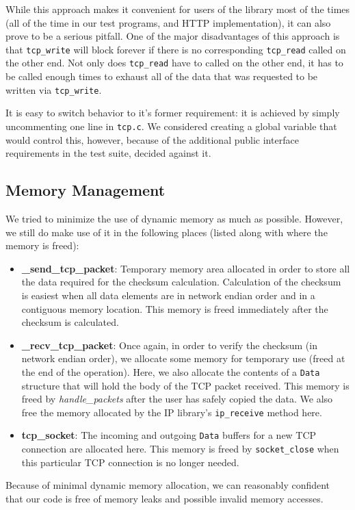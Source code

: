 \documentclass{article}
\begin{document}
While this approach makes it convenient for users of the library most of the times (all of the time in our test programs, and HTTP implementation), it can also prove to be a serious pitfall. One of the major disadvantages of this approach is that  \texttt{tcp\_write} will block forever if there is no corresponding  \texttt{tcp\_read} called on the other end. Not only does \texttt{tcp\_read} have to called on the other end, it has to be called enough times to exhaust all of the data that was requested to be written via  \texttt{tcp\_write}.

It is easy to switch behavior to it's former requirement: it is achieved by simply uncommenting one line in  \texttt{tcp.c}. We considered creating a global variable that would control this, however, because of the additional public interface requirements in the test suite, decided against it.

\subsection{Memory Management}
We tried to minimize the use of dynamic memory as much as possible. However, we still do make use of it in the following places (listed along with where the memory is freed):

\begin{itemize}
\item \textbf{\_send\_tcp\_packet}: Temporary memory area allocated in order to store all the data required for the checksum calculation. Calculation of the checksum is easiest when all data elements are in network endian order and in a contiguous memory location. This memory is freed immediately after the checksum is calculated.

\item \textbf{\_recv\_tcp\_packet}: Once again, in order to verify the checksum (in network endian order), we allocate some memory for temporary use (freed at the end of the operation). Here, we also allocate the contents of a \texttt{Data} structure that will hold the body of the TCP packet received. This memory is freed by \textit{handle\_packets} after the user has safely copied the data. We also free the memory allocated by the IP library's \texttt{ip\_receive} method here.

\item \textbf{tcp\_socket}: The incoming and outgoing \texttt{Data} buffers for a new TCP connection are allocated here. This memory is freed by \texttt{socket\_close} when this particular TCP connection is no longer needed.
\end{itemize}
Because of minimal dynamic memory allocation, we can reasonably confident that our code is free of memory leaks and possible invalid memory accesses.
\end{document}
